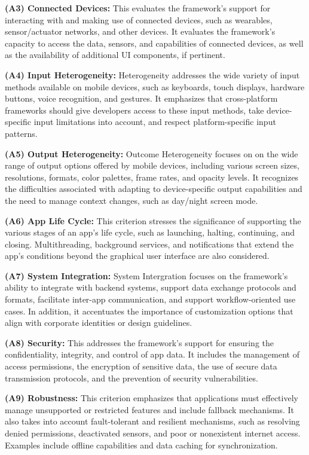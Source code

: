 \textbf{(A3) Connected Devices:}
This evaluates the framework's support for interacting with and making use of connected devices, such as wearables, sensor/actuator networks, and other devices. It evaluates the framework's capacity to access the data, sensors, and capabilities of connected devices, as well as the availability of additional UI components, if pertinent.

\textbf{(A4) Input Heterogeneity:}
Heterogeneity addresses the wide variety of input methods available on mobile devices, such as keyboards, touch displays, hardware buttons, voice recognition, and gestures. It emphasizes that cross-platform frameworks should give developers access to these input methods, take device-specific input limitations into account, and respect platform-specific input patterns.

\textbf{(A5) Output Heterogeneity:}
Outcome Heterogeneity focuses on on the wide range of output options offered by mobile devices, including various screen sizes, resolutions, formats, color palettes, frame rates, and opacity levels. It recognizes the difficulties associated with adapting to device-specific output capabilities and the need to manage context changes, such as day/night screen mode.

\textbf{(A6) App Life Cycle:}
This criterion stresses the significance of supporting the various stages of an app's life cycle, such as launching, halting, continuing, and closing. Multithreading, background services, and notifications that extend the app's conditions beyond the graphical user interface are also considered.

\textbf{(A7) System Integration:}
System Intergration focuses on the framework's ability to integrate with backend systems, support data exchange protocols and formats, facilitate inter-app communication, and support workflow-oriented use cases. In addition, it accentuates the importance of customization options that align with corporate identities or design guidelines.

\textbf{(A8) Security:}
This addresses the framework's support for ensuring the confidentiality, integrity, and control of app data. It includes the management of access permissions, the encryption of sensitive data, the use of secure data transmission protocols, and the prevention of security vulnerabilities.

\textbf{(A9) Robustness:}
This criterion emphasizes that applications must effectively manage unsupported or restricted features and include fallback mechanisms. It also takes into account fault-tolerant and resilient mechanisms, such as resolving denied permissions, deactivated sensors, and poor or nonexistent internet access. Examples include offline capabilities and data caching for synchronization.

